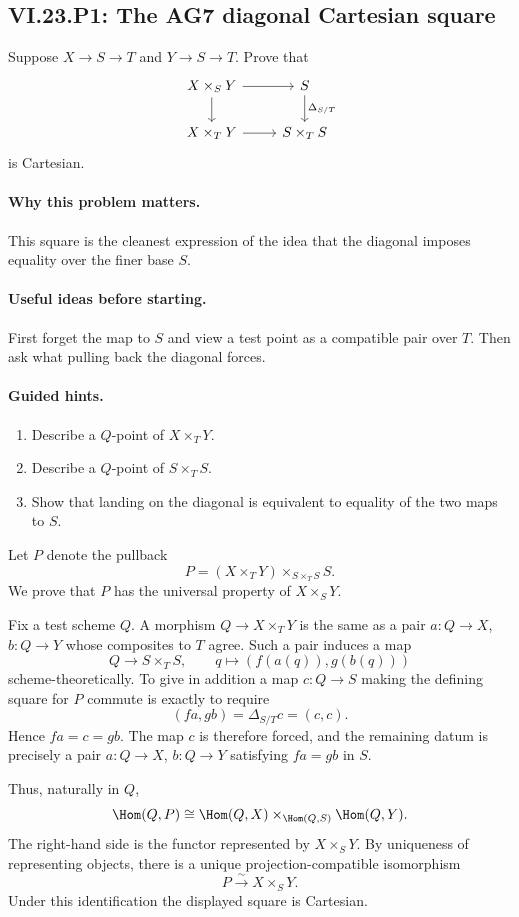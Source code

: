 \subsection*{VI.23.P1: The AG7 diagonal Cartesian square}
\begin{problem}\label{prob:vi23-p01}
Suppose $X\to S\to T$ and $Y\to S\to T$. Prove that
\[
\begin{tikzcd}
X\times_SY \arrow[r] \arrow[d] & S \arrow[d,"\Delta_{S/T}"]\\
X\times_TY \arrow[r] & S\times_TS
\end{tikzcd}
\]
is Cartesian.
\end{problem}

\ifdefined\FullProblemDossiers
\paragraph{Why this problem matters.}
This square is the cleanest expression of the idea that the diagonal imposes equality over the finer base $S$.

\paragraph{Useful ideas before starting.}
First forget the map to $S$ and view a test point as a compatible pair over $T$.  Then ask what pulling back the diagonal forces.

\paragraph{Guided hints.}
\begin{enumerate}
\item Describe a $Q$-point of $X\times_TY$.
\item Describe a $Q$-point of $S\times_TS$.
\item Show that landing on the diagonal is equivalent to equality of the two maps to $S$.
\end{enumerate}

\begin{solution}
Let $P$ denote the pullback
\[
P=(X\times_TY)\times_{S\times_TS}S.
\]
We prove that $P$ has the universal property of $X\times_SY$.

Fix a test scheme $Q$.  A morphism $Q\to X\times_TY$ is the same as a pair
$a:Q\to X$, $b:Q\to Y$ whose composites to $T$ agree.  Such a pair induces a map
\[
Q\longrightarrow S\times_TS,
\qquad
q\longmapsto (f(a(q)),g(b(q)))
\]
scheme-theoretically.  To give in addition a map $c:Q\to S$ making the defining square for $P$
commute is exactly to require
\[
(fa,gb)=\Delta_{S/T}c=(c,c).
\]
Hence $fa=c=gb$.  The map $c$ is therefore forced, and the remaining datum is precisely a pair
$a:Q\to X$, $b:Q\to Y$ satisfying $fa=gb$ in $S$.

Thus, naturally in $Q$,
\[
\Hom(Q,P)
\cong
\Hom(Q,X)\times_{\Hom(Q,S)}\Hom(Q,Y).
\]
The right-hand side is the functor represented by $X\times_SY$.  By uniqueness of representing
objects, there is a unique projection-compatible isomorphism
\[
P\xrightarrow{\sim}X\times_SY.
\]
Under this identification the displayed square is Cartesian.
\end{solution}

